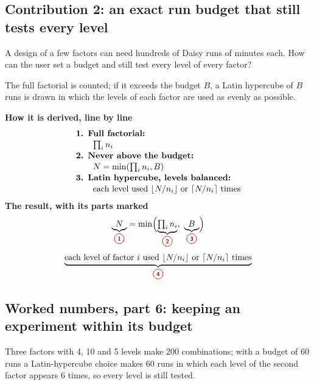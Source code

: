 \subsection{Contribution 2: an exact run budget that still tests every level}\label{con:s3:2}
\begin{problem}
A design of a few factors can need hundreds of Daisy runs of minutes each. How can the user set a budget and still test every level of every factor?
\end{problem}
\begin{derivation}
The full factorial is counted; if it exceeds the budget $B$, a Latin hypercube of $B$ runs is drawn in which the levels of each factor are used as evenly as possible.
\end{derivation}
\begin{keyresult}
\begin{pencil}
{\small\noindent\textbf{How it is derived, line by line}
\[\begin{array}{@{}l@{}}\textbf{1. Full factorial:}\\[1pt]
\qquad \textstyle\prod_in_i\\[1pt]
\textbf{2. Never above the budget:}\\[1pt]
\qquad N=\min(\prod_in_i,B)\\[1pt]
\textbf{3. Latin hypercube, levels balanced:}\\[1pt]
\qquad \text{each level used }\lfloor N/n_i\rfloor\text{ or }\lceil N/n_i\rceil\text{ times}
\end{array}\]}
\noindent\textbf{The result, with its parts marked}
\[\underbrace{N}_{\circled{1}}=\min\Bigl(\underbrace{\textstyle\prod_i n_i}_{\circled{2}},\ \underbrace{B}_{\circled{3}}\Bigr)\]
\[\underbrace{\text{each level of factor } i \text{ used } \lfloor N/n_i\rfloor \text{ or } \lceil N/n_i\rceil \text{ times}}_{\circled{4}}\]
\end{pencil}
\end{keyresult}
\begin{pins}
\end{pins}


\subsection{Worked numbers, part 6: keeping an experiment within its budget}
Three factors with 4, 10 and 5 levels make 200 combinations; with a budget of 60 runs a Latin-hypercube choice makes 60 runs in which each level of the second factor appears 6 times, so every level is still tested.


